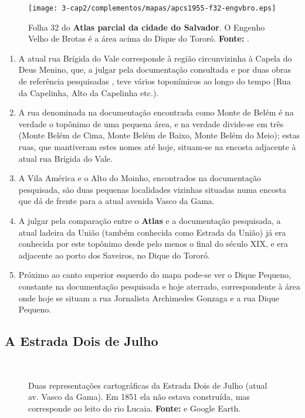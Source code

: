 \begin{figure}[!htp]
\centering
\texttt{[image: 3-cap2/complementos/mapas/apcs1955-f32-engvbro.eps]} 
\caption{Folha 32 do \textbf{Atlas parcial da cidade do Salvador}. O Engenho Velho de Brotas é a área acima do Dique do Tororó. \textbf{Fonte:} .}
\label{fig:atlasenvgelho1955}
\end{figure}

\begin{enumerate}
\item A atual rua Brígida do Vale corresponde à região circunvizinha à Capela do Deus Menino, que, a julgar pela documentação consultada e por duas obras de referência pesquisadas \cite{municipal_atlas_1955,souza_guia_1935}, teve vários toponímicos ao longo do tempo (Rua da Capelinha, Alto da Capelinha etc.).
\item A rua denominada na documentação encontrada como Monte de Belém é na verdade o topônimo de uma pequena área, e na verdade divide-se em três (Monte Belém de Cima, Monte Belém de Baixo, Monte Belém do Meio); estas ruas, que mantiveram estes nomes até hoje, situam-se na encosta adjacente à atual rua Brígida do Vale.
\item A Vila América e o Alto do Moinho, encontrados na documentação pesquisada, são duas pequenas localidades vizinhas situadas numa encosta que dá de frente para a atual avenida Vasco da Gama.
\item A julgar pela comparação entre o \textbf{Atlas} e a documentação pesquisada, a atual ladeira da União (também conhecida como Estrada da União) já era conhecida por este topônimo desde pelo menos o final do século XIX, e era adjacente ao porto dos Saveiros, no Dique do Tororó.
\item Próximo ao canto superior esquerdo do mapa pode-se ver o Dique Pequeno, constante na documentação pesquisada e hoje aterrado, correspondente à área onde hoje se situam a rua Jornalista Archimedes Gonzaga e a rua Dique Pequeno.
\end{enumerate}









\subsection{A Estrada Dois de Julho}

\begin{figure}[!htp]
\centering
{}
\  %
\caption{Duas representações cartográficas da Estrada Dois de Julho (atual av. Vasco da Gama). Em 1851 ela não estava construída, mas corresponde ao leito do rio Lucaia. \textbf{Fonte:}  e Google Earth.}
\end{figure}

